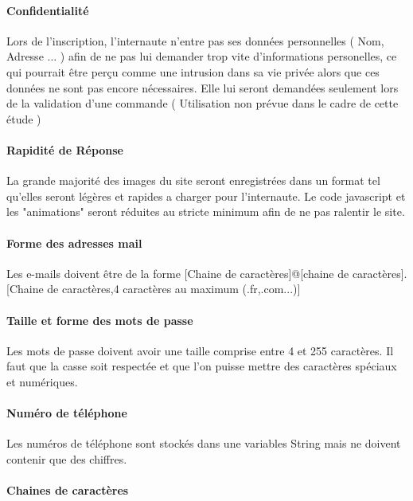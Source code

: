 \paragraph{Confidentialité}

Lors de l'inscription, l'internaute n'entre pas ses données personnelles ( Nom, Adresse ... ) afin de ne pas lui demander trop vite
d'informations personelles, ce qui pourrait être perçu comme une intrusion dans sa vie privée alors que ces données ne sont pas encore
nécessaires. Elle lui seront demandées seulement lors de la validation d'une commande ( Utilisation non prévue dans le cadre de cette étude )

\paragraph{Rapidité de Réponse}
	
La grande majorité des images du site seront enregistrées dans un format tel qu'elles seront légères et rapides a charger pour l'internaute.
Le code javascript et les "animations" seront réduites au stricte minimum afin de ne pas ralentir le site.

\paragraph{Forme des adresses mail}

Les e-mails doivent être de la forme [Chaine de caractères]@[chaine de caractères].[Chaine de caractères,4 caractères au maximum (.fr,.com...)]

\paragraph{Taille et forme des mots de passe}

Les mots de passe doivent avoir une taille comprise entre 4 et 255 caractères. Il faut que la casse soit respectée et que l'on puisse mettre des caractères spéciaux et numériques.

\paragraph{Numéro de téléphone}

Les numéros de téléphone sont stockés dans une variables String mais ne doivent contenir que des chiffres.

\paragraph{Chaines de caractères}

